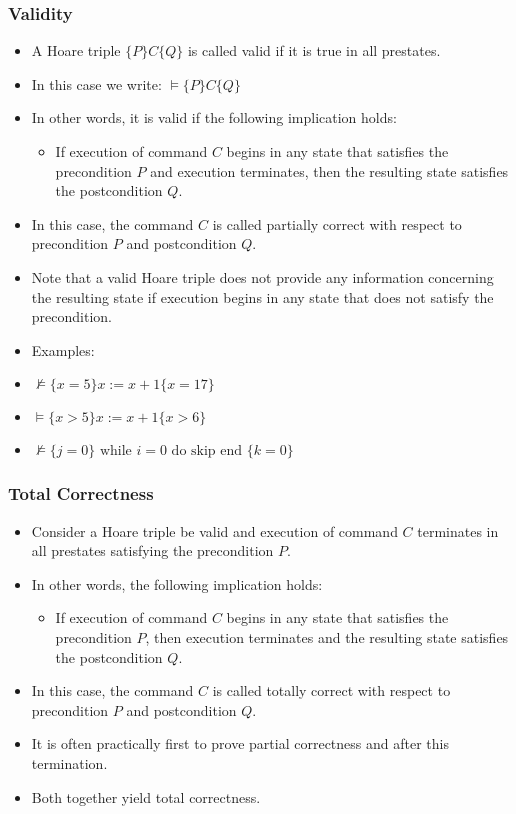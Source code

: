 \begin{multicols}{2}
\subsubsection{Validity}
\begin{itemize}
  \item A Hoare triple $\{P\}C\{Q\}$ is called valid if it is true in all prestates.
  \item In this case we write: $\models\{P\}C\{Q\}$
  \item In other words, it is valid if the following implication holds:
  \begin{itemize}
    \item If execution of command $C$ begins in any state that satisfies the precondition $P$ and execution terminates, then the resulting state satisfies the postcondition $Q$.
  \end{itemize}
  \item In this case, the command $C$ is called partially correct with respect to precondition $P$ and postcondition $Q$.
  \item Note that a valid Hoare triple does not provide any information concerning the resulting state if execution begins in any state that does not satisfy the precondition.
  \item Examples:
  \item [\-] $\nvDash \{x=5\} x := x + 1 \{x=17\}$
  \item [\-] $\models \{x>5\} x := x + 1 \{x>6\}$
  \item [\-] $\nvDash \{j=0\} \text{ while } i = 0 \text{ do skip end } \{k=0\}$
\end{itemize}

\subsubsection{Total Correctness}
\begin{itemize}
  \item Consider a Hoare triple be valid and execution of command $C$ terminates in all prestates satisfying the precondition $P$.
  \item In other words, the following implication holds:
  \begin{itemize}
    \item If execution of command $C$ begins in any state that satisfies the precondition $P$, then execution terminates and the resulting state satisfies the postcondition $Q$.
  \end{itemize}
  \item In this case, the command $C$ is called totally correct with respect to precondition $P$ and postcondition $Q$.
  \item It is often practically first to prove partial correctness and after this termination.
  \item Both together yield total correctness.
\end{itemize}


\end{multicols}
